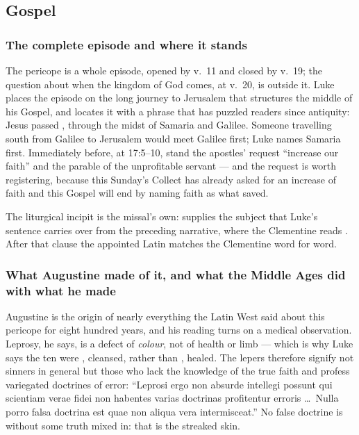 \elementguard
\subsection*{Gospel }


\subsubsection*{The complete episode and where it stands}

The pericope is a whole episode, opened by v.~11 and closed by v.~19; the
question about when the kingdom of God comes, at v.~20, is outside it. Luke
places the episode on the long journey to Jerusalem that structures the middle
of his Gospel, and locates it with a phrase that has puzzled readers since
antiquity: Jesus passed , through the
midst of Samaria and Galilee. Someone travelling south from Galilee to
Jerusalem would meet Galilee first; Luke names Samaria first. Immediately
before, at 17:5--10, stand the apostles' request ``increase our faith'' and the
parable of the unprofitable servant --- and the request is worth registering,
because this Sunday's Collect has already asked for an increase of faith and
this Gospel will end by naming faith as what saved.

The liturgical incipit is the missal's own:  supplies the subject that Luke's sentence carries over
from the preceding narrative, where the Clementine reads . After that clause the appointed Latin matches the
Clementine word for word.

\subsubsection*{What Augustine made of it, and what the Middle Ages did with what he made}

Augustine is the origin of nearly everything the Latin West said about this
pericope for eight hundred years, and his reading turns on a medical
observation. Leprosy, he says, is a defect of \textit{colour}, not of health
or limb --- which is why Luke says the ten were , cleansed,
rather than , healed. The lepers therefore signify not sinners
in general but those who lack the knowledge of the true faith and profess
variegated doctrines of error: ``Leprosi ergo non absurde intellegi possunt
qui scientiam verae fidei non habentes varias doctrinas profitentur erroris
\dots\ Nulla porro falsa doctrina est quae non aliqua vera intermisceat.'' No
false doctrine is without some truth mixed in: that is the streaked skin.

